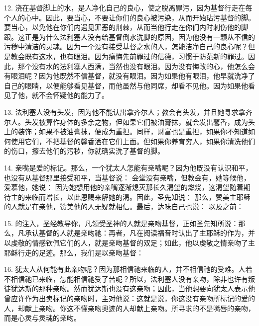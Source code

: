 12. 浇在基督脚上的水，是人净化自己的良心，使之脱离罪污，因为基督行走在每个人的心中。因此，要当心，不要让你们的良心被污染，从而开始玷污基督的脚。要当心，以免他在你们内遇见罪恶的荆棘，从而当他行走在你们内时刺伤他的脚跟。这正是为什么法利塞人没有给基督倒水洗脚的原因，因为他没有一颗从不信的污秽中清洁的灵魂。因为一个没有接受基督之水的人，怎能洁净自己的良心呢？但是教会既有这水，也有眼泪。因为痛悔先前罪过的信德，习惯于防范新的罪过。因此，那个没有水的法利塞人西满，当然也没有眼泪。因为没有悔改的心，他怎么会有眼泪呢？因为他既然不信基督，就没有眼泪。因为如果他有眼泪，他早就洗净了自己的眼睛，以便能够看见基督，而他虽然与他同席，却看不见他。因为如果他看见了他，就不会怀疑他的能力了。\par

13. 法利塞人没有头发，因为他不能认出拿齐尔人；教会有头发，并且她寻求拿齐尔人。头发被算作身体的多余之物，但如果它们被油膏抹，就会发出馨香，成为头上的装饰；如果不被油膏抹，便成为重担。同样，财富也是重担，如果你不知道如何使用它们，不把基督的馨香洒在它们上面。但如果你养育穷人，如果你清洗他们的伤口，擦去他们的污秽，你就确实洗了基督的脚。\par

14.  亲嘴是爱的标记。那么，一个犹太人怎能有亲嘴呢？因为他既没有认识和平，也没有从基督那里接受和平，当基督说： 会堂没有亲嘴，但教会有，她等候他，爱慕他，她说： 因为她想用他的亲嘴逐渐熄灭那长久渴望的燃烧，这渴望随着期待主的来临而增长，以此恩赐来解她的渴。因此，圣先知说： 那么，赞美主耶稣的人就是在亲他，赞美他的人无疑就相信。最后，达味自己也说： 以及之前：\par

15. 的注入，圣经教导你，凡领受圣神的人就是亲吻基督，正如圣先知所说：那么，凡承认基督的人就是亲吻祂：再者，凡在阅读福音时认出了主耶稣的作为，并以虔敬的情感钦佩它们的人，就是亲吻基督的双足；如此，他以虔敬之情亲吻了主耶稣行走的足迹。那么，我们是以亲吻基督：\par

16. 犹太人从何能有此亲吻呢？因为那相信祂来临的人，并不相信祂的受难。人若不相信祂已来临，怎能相信祂受了苦呢？所以，法利塞人没有亲吻，除非也许有叛徒犹达斯的那种亲吻。然而犹达斯也没有这亲吻；因此，当他想要向犹太人表示他曾应许作为出卖标记的亲吻时，主对他说：这就是说，你这没有亲吻所标记的爱的人，却献上亲吻。你这不懂亲吻奥迹的人却献上亲吻。所寻求的不是嘴唇的亲吻，而是心灵与灵魂的亲吻。\par

